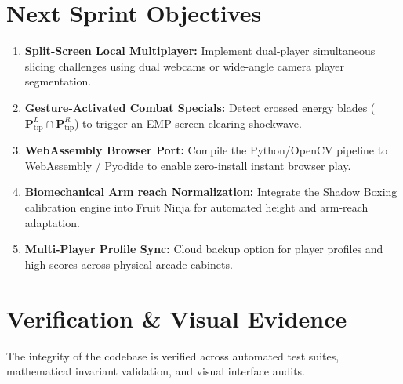 \documentclass[11pt,a4paper]{article}
\begin{document}
\clearpage

\section{Next Sprint Objectives}

\begin{enumerate}[leftmargin=1.5em, itemsep=2pt, topsep=2pt]
  \item \textbf{Split-Screen Local Multiplayer:} Implement dual-player simultaneous slicing challenges using dual webcams or wide-angle camera player segmentation.
  \item \textbf{Gesture-Activated Combat Specials:} Detect crossed energy blades ($\mathbf{P}_{\mathrm{tip}}^L \cap \mathbf{P}_{\mathrm{tip}}^R$) to trigger an EMP screen-clearing shockwave.
  \item \textbf{WebAssembly Browser Port:} Compile the Python/OpenCV pipeline to WebAssembly / Pyodide to enable zero-install instant browser play.
  \item \textbf{Biomechanical Arm reach Normalization:} Integrate the Shadow Boxing calibration engine into Fruit Ninja for automated height and arm-reach adaptation.
  \item \textbf{Multi-Player Profile Sync:} Cloud backup option for player profiles and high scores across physical arcade cabinets.
\end{enumerate}

\section{Verification \& Visual Evidence}

The integrity of the codebase is verified across automated test suites, mathematical invariant validation, and visual interface audits.
\end{document}
